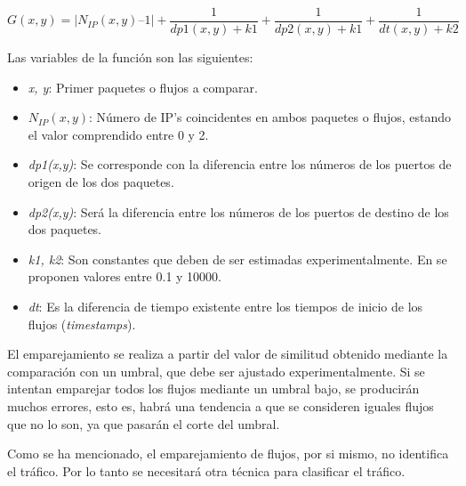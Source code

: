 \begin{equation}\label{ecug}
G(x,y) = |N_{IP}(x,y) – 1| + \frac{1}{dp1(x,y) + k1} + \frac{1}{dp2(x,y) + k1} + \frac{1}{dt(x,y) + k2}
\end{equation}

\intro Las variables de la función son las siguientes: 

\begin{itemize}
\item \textit{x, y}: Primer paquetes o flujos a comparar.
\item \textit{$N_{IP}(x,y)$}: Número de IP's coincidentes en ambos paquetes o flujos, estando el valor comprendido entre 0 y 2.
\item \textit{dp1(x,y)}: Se corresponde con la diferencia entre los números de los puertos de origen de los dos paquetes.
\item \textit{dp2(x,y)}: Será la diferencia entre los números de los puertos de destino de los dos paquetes.
\item \textit{k1, k2}: Son constantes que deben de ser estimadas experimentalmente. En \cite{comparacion} se proponen valores entre 
0.1 y 10000.
\item \textit{dt}: Es la diferencia de tiempo existente entre los tiempos de inicio de los flujos (\textit{timestamps}).
\end{itemize}

\intro El emparejamiento se realiza a partir del valor de similitud obtenido mediante la comparación con un umbral, que debe ser 
ajustado experimentalmente. Si se intentan emparejar todos los flujos mediante un umbral bajo, se producirán muchos errores, esto es, 
habrá una tendencia a que se consideren iguales flujos que no lo son, ya que pasarán el corte del umbral.

\intro Como se ha mencionado, el emparejamiento de flujos, por si mismo, no identifica el tráfico. Por lo tanto se 
necesitará otra técnica para clasificar el tráfico.
